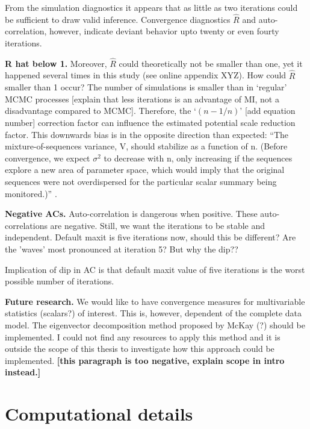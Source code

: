 \documentclass[article]{jss}
\begin{document}
From the simulation diagnostics it appears that as little as two iterations could be sufficient to draw valid inference. Convergence diagnostics $\widehat{R}$ and auto-correlation, however, indicate deviant behavior upto twenty or even fourty iterations. 

\textbf{R hat below 1.}
Moreover, $\widehat{R}$ could theoretically not be smaller than one, yet it happened several times in this study (see online appendix XYZ). How could $\widehat{R}$ smaller than 1 occur? The number of simulations is smaller than in `regular' MCMC processes [explain that less iterations is an advantage of MI, not a disadvantage compared to MCMC]. Therefore, the `$(n-1/n)$' [add equation number] correction factor can influence the estimated potential scale reduction factor. This downwards bias is in the opposite direction than expected: ``The mixture-of-sequences variance, V, should stabilize as a function of n. (Before convergence, we expect $\sigma^2$ to decrease with n, only increasing if the sequences explore a new area of parameter space, which would imply that the original sequences were not overdispersed for the particular scalar summary being monitored.)'' \cite[p~438]{broo98}.


\textbf{Negative ACs.} Auto-correlation is dangerous when positive. These auto-correlations are negative. Still, we want the iterations to be stable and independent. Default maxit is five iterations now, should this be different? Are the 'waves' most pronounced at iteration 5? But why the dip??  

Implication of dip in AC is that default maxit value of five iterations is the worst possible number of iterations.

\textbf{Future research.} We would like to have convergence measures for multivariable statistics (scalars?) of interest. This is, however, dependent of the complete data model. The eigenvector decomposition method proposed by McKay (?) should be implemented. I could not find any resources to apply this method and it is outside the scope of this thesis to investigate how this approach could be implemented. \textbf{[this paragraph is too negative, explain scope in intro instead.]}


\section*{Computational details}
\end{document}
